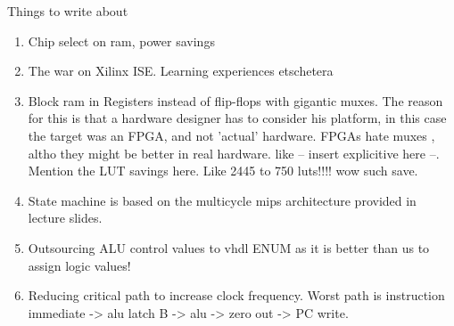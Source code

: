 Things to write about

\begin{enumerate}
  \item
    Chip select on ram, power savings

  \item
    The war on Xilinx ISE. Learning experiences etschetera

  \item
    Block ram in Registers instead of flip-flops with gigantic muxes. The reason for this is that a hardware designer has to consider his platform, in this case the target was an FPGA, and not 'actual' hardware. FPGAs hate muxes , altho they might be better in real hardware. like -- insert explicitive here --. Mention the LUT savings here. Like 2445 to 750 luts!!!! wow such save.

  \item
    State machine is based on the multicycle mips architecture provided in lecture slides.

  \item
    Outsourcing ALU control values to vhdl ENUM as it is better than us to assign logic values!

  \item
    Reducing critical path to increase clock frequency. Worst path is instruction immediate -> alu latch B -> alu -> zero out -> PC write.


\end{enumerate}
